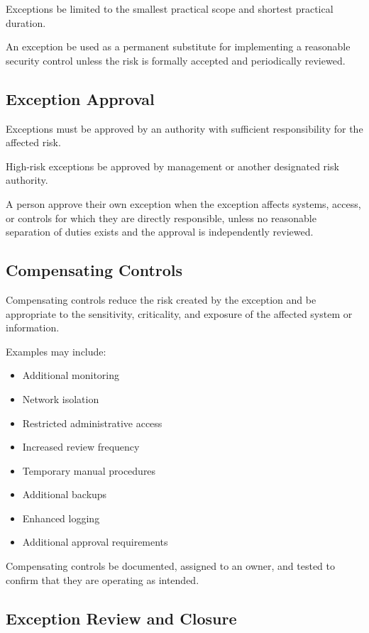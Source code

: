 Exceptions \must{} be limited to the smallest practical scope and shortest practical duration.

An exception \mustnot{} be used as a permanent substitute for implementing a reasonable security control unless the risk is formally accepted and periodically reviewed.

\subsection{Exception Approval}

Exceptions must be approved by an authority with sufficient responsibility for the affected risk.

High-risk exceptions \must{} be approved by management or another designated risk authority.

A person \mustnot{} approve their own exception when the exception affects systems, access, or controls for which they are directly responsible, unless no reasonable separation of duties exists and the approval is independently reviewed.

\subsection{Compensating Controls}

Compensating controls \must{} reduce the risk created by the exception and \must{} be appropriate to the sensitivity, criticality, and exposure of the affected system or information.

Examples may include:
\begin{itemize}
    \item Additional monitoring
    \item Network isolation
    \item Restricted administrative access
    \item Increased review frequency
    \item Temporary manual procedures
    \item Additional backups
    \item Enhanced logging
    \item Additional approval requirements
\end{itemize}

Compensating controls \must{} be documented, assigned to an owner, and tested to confirm that they are operating as intended.

\subsection{Exception Review and Closure}

